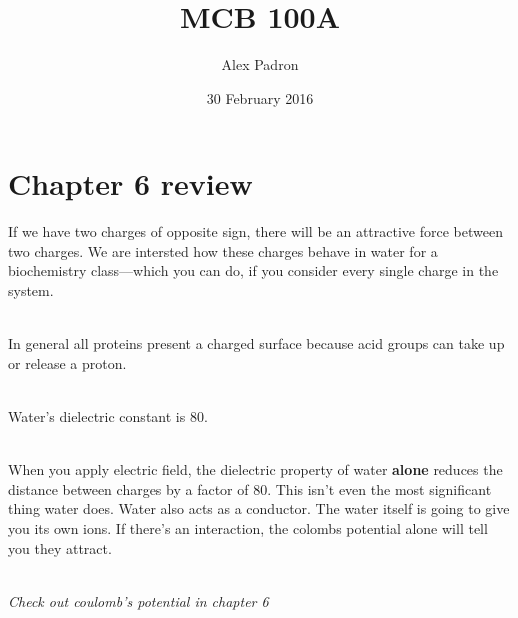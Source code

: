 \documentclass{article}
\title{MCB 100A}
\author{Alex Padron}
\date{30 February 2016}
\begin{document}
\maketitle

\section{Chapter 6 review}

If we have two charges of opposite sign, there will be an attractive force between two charges. We are intersted how these charges behave in water for a biochemistry class––which you can do, if you consider every single charge in the system.

\mbox{ }\\
In general all proteins present a charged surface because acid groups can take up or release a proton.

\mbox{ }\\
Water's dielectric constant is 80\epsilon.  

\mbox{}\\
When you apply electric field, the dielectric property of water \textbf{alone} reduces the distance between charges by a factor of 80. This isn't even the most significant thing water does. Water also acts as a conductor. The water itself is going to give you its own ions. If there's an interaction, the colombs potential alone will tell you they attract.

\mbox{}\\
\textit{Check out coulomb's potential in chapter 6}
\end{document}
